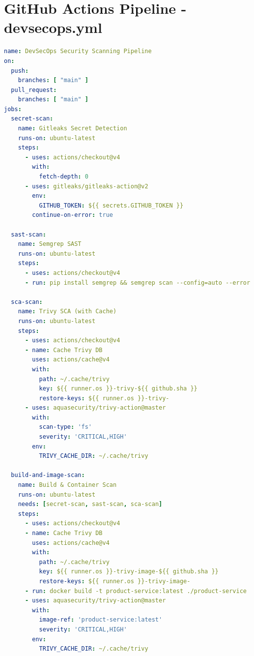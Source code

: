 \documentclass[12pt,a4paper]{report}
\begin{document}
\section{GitHub Actions Pipeline - devsecops.yml}
\begin{lstlisting}[language=YAML, caption={File cấu hình GitHub Actions CI/CD Pipeline DevSecOps}]
name: DevSecOps Security Scanning Pipeline
on:
  push:
    branches: [ "main" ]
  pull_request:
    branches: [ "main" ]
jobs:
  secret-scan:
    name: Gitleaks Secret Detection
    runs-on: ubuntu-latest
    steps:
      - uses: actions/checkout@v4
        with:
          fetch-depth: 0
      - uses: gitleaks/gitleaks-action@v2
        env:
          GITHUB_TOKEN: ${{ secrets.GITHUB_TOKEN }}
        continue-on-error: true

  sast-scan:
    name: Semgrep SAST
    runs-on: ubuntu-latest
    steps:
      - uses: actions/checkout@v4
      - run: pip install semgrep && semgrep scan --config=auto --error

  sca-scan:
    name: Trivy SCA (with Cache)
    runs-on: ubuntu-latest
    steps:
      - uses: actions/checkout@v4
      - name: Cache Trivy DB
        uses: actions/cache@v4
        with:
          path: ~/.cache/trivy
          key: ${{ runner.os }}-trivy-${{ github.sha }}
          restore-keys: ${{ runner.os }}-trivy-
      - uses: aquasecurity/trivy-action@master
        with:
          scan-type: 'fs'
          severity: 'CRITICAL,HIGH'
        env:
          TRIVY_CACHE_DIR: ~/.cache/trivy

  build-and-image-scan:
    name: Build & Container Scan
    runs-on: ubuntu-latest
    needs: [secret-scan, sast-scan, sca-scan]
    steps:
      - uses: actions/checkout@v4
      - name: Cache Trivy DB
        uses: actions/cache@v4
        with:
          path: ~/.cache/trivy
          key: ${{ runner.os }}-trivy-image-${{ github.sha }}
          restore-keys: ${{ runner.os }}-trivy-image-
      - run: docker build -t product-service:latest ./product-service
      - uses: aquasecurity/trivy-action@master
        with:
          image-ref: 'product-service:latest'
          severity: 'CRITICAL,HIGH'
        env:
          TRIVY_CACHE_DIR: ~/.cache/trivy
\end{lstlisting}
\end{document}
